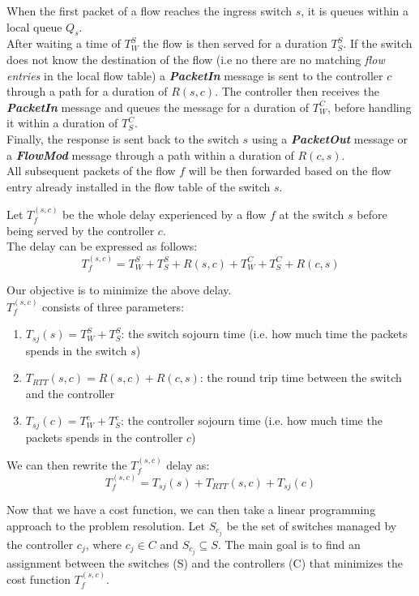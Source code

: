 \documentclass{article}
\begin{document}
When the first packet of a flow reaches the ingress switch $s$, it is queues within a local queue $Q_s$. \\
After waiting a time of $T^S_W$ the flow is then served for a duration $T^S_S$.
If the switch does not know the destination of the flow (i.e no there are no matching \textit{flow entries} in the local flow table) a \textit{\textbf{PacketIn}} message is sent to the controller $c$ through a path for a duration of $R(s,c)$.
The controller then receives the \textit{\textbf{PacketIn}} message and queues the message for a duration of $T^C_W$, before handling it within a duration of $T^C_S$. \\
Finally, the response is sent back to the switch $s$ using a \textit{\textbf{PacketOut}} message or a \textit{\textbf{FlowMod}} message through a path within a duration of $R(c, s)$. \\
All subsequent packets of the flow $f$ will be then forwarded based on the flow  entry already installed in the flow table of the switch $s$.

Let $T^{(s,c)}_f$ be the whole delay experienced by a flow $f$ at the switch $s$ before being served by the controller $c$. \\
The delay can be expressed as follows:
\[
	T^{(s,c)}_f = T^S_W + T^S_S + R(s,c) + T^C_W + T^C_S + R(c, s)
\]

Our objective is to minimize the above delay. \\
$T^{(s,c)}_f$ consists of three parameters:
\begin{enumerate}
	\item $T_{sj}(s) = T^S_W + T^S_S$: the switch sojourn time (i.e. how much time the packets spends in the switch $s$)
	\item $T_{RTT}(s,c) = R(s,c) + R(c, s)$: the round trip time between the switch and the controller
	\item $T_{sj}(c) = T^c_W + T^c_S$: the controller sojourn time (i.e. how much time the packets spends in the controller $c$)
\end{enumerate}

We can then rewrite the $T^{(s,c)}_f$ delay as: 
\[
	T^{(s,c)}_f =  T_{sj}(s) +  T_{RTT}(s,c) + T_{sj}(c)
\]

Now that we have a cost function, we can then take a linear programming approach to the problem resolution.
Let $S_{c_j}$ be the set of switches managed by the controller $c_j$, where $c_j \in C$ and $S_{c_j} \subseteq S$.
The main goal is to find an assignment between the switches (S) and the controllers (C) that minimizes the cost function $T^{(s,c)}_f$. \\
\end{document}
